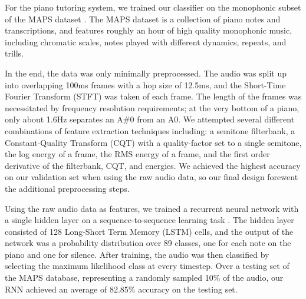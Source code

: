 \documentclass[twocolumn]{article}
\begin{document}
For the piano tutoring system, we trained our classifier on the monophonic subset of the MAPS dataset \cite{emiya2010maps}. The MAPS dataset is a collection of piano notes and transcriptions, and features roughly an hour of high quality monophonic music, including chromatic scales, notes played with different dynamics, repeats, and trills.

In the end, the data was only minimally preprocessed. The audio was split up into overlapping 100ms frames with a hop size of 12.5ms, and the Short-Time Fourier Transform (STFT) was taken of each frame. The length of the frames was necessitated by frequency resolution requirements; at the very bottom of a piano, only about 1.6Hz separates an A\#0 from an A0. We attempted several different combinations of feature extraction techniques including: a semitone filterbank, a Constant-Quality Transform (CQT) with a quality-factor set to a single semitone, the log energy of a frame, the RMS energy of a frame, and the first order derivative of the filterbank, CQT, and energies. We achieved the highest accuracy on our validation set when using the raw audio data, so our final design forewent the additional preprocessing steps.

Using the raw audio data as features, we trained a recurrent neural network with a single hidden layer on a sequence-to-sequence learning task \cite{karpathy2015unreasonable}. The hidden layer consisted of 128 Long-Short Term Memory (LSTM) cells, and the output of the network was a probability distribution over 89 classes, one for each note on the piano and one for silence. After training, the audio was then classified by selecting the maximum likelihood class at every timestep. Over a testing set of the MAPS database, representing a randomly sampled 10\% of the audio, our RNN achieved an average of 82.85\% accuracy on the testing set. 
\end{document}
